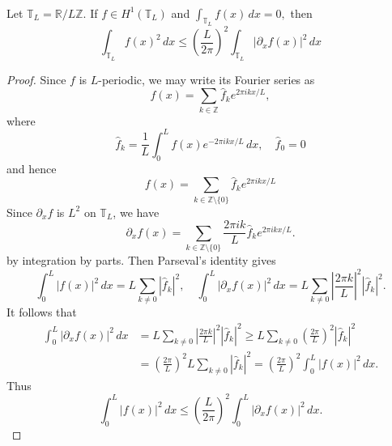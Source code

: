 \begin{theorem}\ \par
Let \(\mathbb T_L=\mathbb R/L\mathbb Z\). If \(f\in H^1(\mathbb T_L)\) and
\(
\int_{\mathbb T_L} f(x)\,dx=0,
\)
then
\[
\int_{\mathbb T_L} f(x)^2\,dx
\le
\left(\frac{L}{2\pi}\right)^2
\int_{\mathbb T_L} |\partial_x f(x)|^2\,dx\label{eq: poincare for periodic}
\]
\end{theorem}
\begin{proof}
Since \(f\) is \(L\)-periodic, we may write its Fourier series as
\[
f(x)=\sum_{k\in\mathbb Z}\widehat f_k e^{2\pi i kx/L},
\]
where
\[
\widehat f_k
=
\frac1L\int_0^L f(x)e^{-2\pi i kx/L}\,dx,\quad \widehat f_0 = 0
\]
and hence
\[
f(x)=\sum_{k\in\mathbb Z\setminus\{0\}}
\widehat f_k e^{2\pi i kx/L}
\]
Since $\partial_x f$ is $L^2$ on $\mathbb{T}_L$, we have 
\[
\partial_xf(x)
=
\sum_{k\in\mathbb Z\setminus\{0\}}
\frac{2\pi i k}{L}
\widehat f_k e^{2\pi i kx/L}.
\]
by integration by parts. Then Parseval's identity gives
\[
\int_0^L |f(x)|^2\,dx
=
L\sum_{k\neq 0}|\widehat f_k|^2,\quad 
\int_0^L |\partial_x f(x)|^2\,dx
=
L\sum_{k\neq 0}
\left|\frac{2\pi k}{L}\right|^2
|\widehat f_k|^2.
\]
It follows that
\[
\begin{aligned}
\int_0^L |\partial_x f(x)|^2\,dx
&=
L\sum_{k\neq 0}
\left|\frac{2\pi k}{L}\right|^2
|\widehat f_k|^2 \geq
L\sum_{k\neq 0}
\left(\frac{2\pi}{L}\right)^2
|\widehat f_k|^2 \\
&=
\left(\frac{2\pi}{L}\right)^2
L\sum_{k\neq 0}|\widehat f_k|^2 =
\left(\frac{2\pi}{L}\right)^2
\int_0^L |f(x)|^2\,dx.
\end{aligned}
\]
Thus
\[
\int_0^L |f(x)|^2\,dx
\le
\left(\frac{L}{2\pi}\right)^2
\int_0^L |\partial_x f(x)|^2\,dx.
\]
\end{proof}

